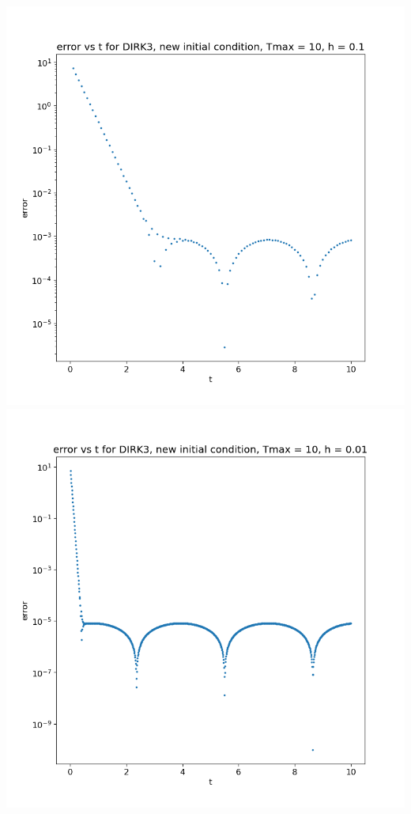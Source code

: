 \documentclass{article}
\begin{document}
\begin{enumerate}
\begin{enumerate}[label=(\alph*)]
\begin{center}
		\includegraphics[scale=.3]{hw3 dirk3 err vs t graph 1}
		\includegraphics[scale=.3]{hw3 dirk3 err vs t graph 2}

\end{center}
\end{enumerate}
\end{enumerate}
\end{document}
